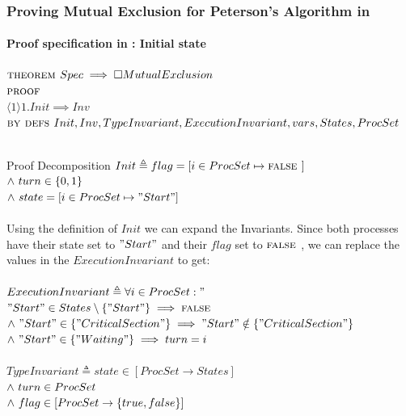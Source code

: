 \documentclass[xcolor=dvipsnames]{beamer}
\begin{document}
\begin{frame}
		\frametitle{Proving Mutual Exclusion for Peterson's Algorithm in \tla}
	\framesubtitle{Proof specification in \tla : Initial state}
	
	\fontsize{8}{7.2}\selectfont
	$\textsc{theorem } Spec \implies \square MutualExclusion$\\
	$\textsc{proof }$\\
	\hspace*{0.8cm}$\langle1\rangle1. Init \implies Inv$\\
	\hspace*{1.2cm} $\textsc{by } \textsc{defs } Init, Inv, TypeInvariant, ExecutionInvariant, vars,States,ProcSet$\\~\\
	\begin{block}{Proof Decomposition}
		$ Init \triangleq flag = [i \in ProcSet \mapsto \mbox{\textsc{false }}]$ \\
		\hspace*{0.8cm}$\land \  turn \in \{0,1\}$\\
		\hspace*{0.8cm}$\land \   state =  [i \in ProcSet \mapsto "Start"]$\\~\\ 
		Using the definition of $Init$ we can expand the Invariants. Since both processes have their state set to $"Start"$ and their $flag$ set to $\mbox{\textsc{false }}$, we can replace the values in the $ExecutionInvariant$ to get: \\~\\
		$ ExecutionInvariant \triangleq \forall i \in ProcSet:"$ \\
		\hspace*{0.8cm}$"Start" \in States \setminus  \{"Start"\} \implies \mbox{\textsc{false }} $\\
		\hspace*{0.8cm}$\land \   "Start" \in \{"CriticalSection"\} \implies "Start" \notin \{"CriticalSection"\}$\\
		\hspace*{0.8cm}$\land \  "Start" \in \{"Waiting"\} \implies turn = i$\\~\\
		$ TypeInvariant \triangleq state \in [ProcSet \rightarrow States]$ \\
		\hspace*{0.8cm}$\land \  turn \in ProcSet$\\
		\hspace*{0.8cm}$\land \  flag \in [ProcSet \rightarrow \{true, false\}]$
	\end{block}
\end{frame}
\end{document}
